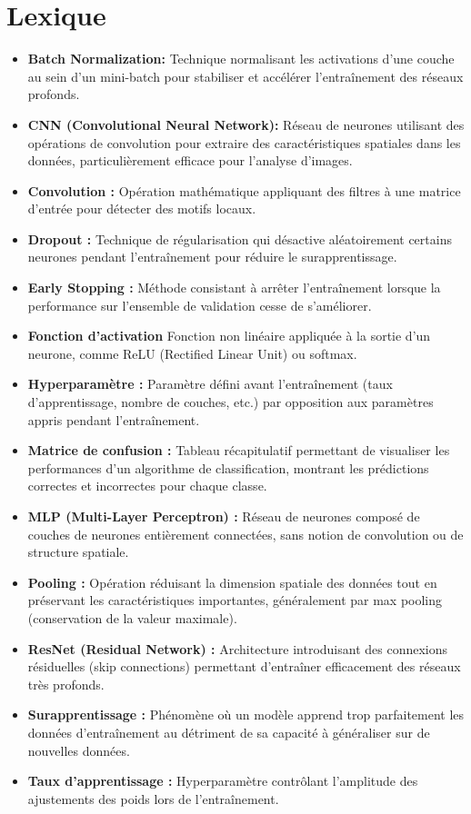 \section*{Lexique}
\begin{flushleft}
\begin{itemize}
\item \textbf{Batch Normalization:} Technique normalisant les activations d'une couche au sein d'un mini-batch pour stabiliser et accélérer l'entraînement des réseaux profonds.
\item \textbf{CNN (Convolutional Neural Network):} Réseau de neurones utilisant des opérations de convolution pour extraire des caractéristiques spatiales dans les données, particulièrement efficace pour l'analyse d'images.
\item \textbf{Convolution :} Opération mathématique appliquant des filtres à une matrice d'entrée pour détecter des motifs locaux.
\item \textbf{Dropout :} Technique de régularisation qui désactive aléatoirement certains neurones pendant l'entraînement pour réduire le surapprentissage.
\item \textbf{Early Stopping :} Méthode consistant à arrêter l'entraînement lorsque la performance sur l'ensemble de validation cesse de s'améliorer.
\item \textbf{Fonction d'activation} Fonction non linéaire appliquée à la sortie d'un neurone, comme ReLU (Rectified Linear Unit) ou softmax.
\item \textbf{Hyperparamètre :} Paramètre défini avant l'entraînement (taux d'apprentissage, nombre de couches, etc.) par opposition aux paramètres appris pendant l'entraînement.
\item \textbf{Matrice de confusion :} Tableau récapitulatif permettant de visualiser les performances d'un algorithme de classification, montrant les prédictions correctes et incorrectes pour chaque classe.
\item \textbf{MLP (Multi-Layer Perceptron) :} Réseau de neurones composé de couches de neurones entièrement connectées, sans notion de convolution ou de structure spatiale.
\item \textbf{Pooling :} Opération réduisant la dimension spatiale des données tout en préservant les caractéristiques importantes, généralement par max pooling (conservation de la valeur maximale).
\item \textbf{ResNet (Residual Network) :} Architecture introduisant des connexions résiduelles (skip connections) permettant d'entraîner efficacement des réseaux très profonds.
\item \textbf{Surapprentissage :} Phénomène où un modèle apprend trop parfaitement les données d'entraînement au détriment de sa capacité à généraliser sur de nouvelles données.
\item \textbf{Taux d'apprentissage :} Hyperparamètre contrôlant l'amplitude des ajustements des poids lors de l'entraînement.
\end{itemize}
\end{flushleft}
